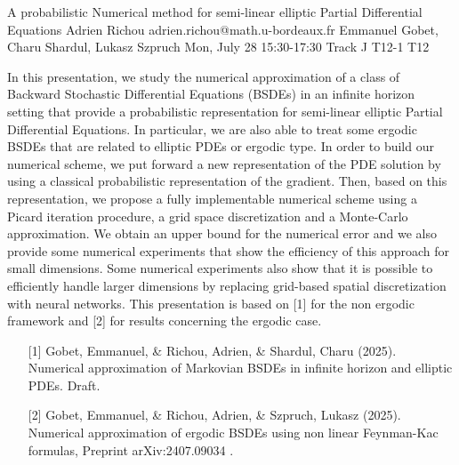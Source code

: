 \begin{talk}
  {A probabilistic Numerical method for semi-linear elliptic Partial Differential Equations}%
  {Adrien Richou}%
  {adrien.richou@math.u-bordeaux.fr}%
  {Emmanuel Gobet, Charu Shardul, Lukasz Szpruch}%
  {}%
  {}%
  {Mon, July 28 15:30-17:30 Track J}%
  {T12-1}%
  {T12}%
  
				
			
In this presentation, we study the numerical approximation of a class of Backward Stochastic Differential Equations (BSDEs) in an infinite horizon setting that provide a probabilistic representation for semi-linear elliptic Partial Differential Equations. In particular, we are also able to treat some ergodic BSDEs that are related to elliptic PDEs or ergodic type. In order to build our numerical scheme, we put forward a new representation of the PDE solution by using a classical probabilistic representation of the gradient. Then, based on this representation, we propose a fully implementable numerical scheme using a Picard iteration procedure, a grid space discretization and a Monte-Carlo approximation. We obtain an upper bound for the numerical error and we also provide some numerical experiments that show the
efficiency of this approach for small dimensions. Some numerical experiments also show that it is possible to efficiently handle larger dimensions by replacing grid-based spatial discretization with neural networks. This presentation is based on [1] for the non ergodic framework and [2] for results concerning the ergodic case.

\medskip

\begin{enumerate}
	\item[{[1]}] Gobet, Emmanuel, \& Richou, Adrien, \& Shardul, Charu (2025). Numerical approximation of Markovian BSDEs in infinite
  horizon and elliptic PDEs. Draft.
	\item[{[2]}] Gobet, Emmanuel, \& Richou, Adrien, \& Szpruch, Lukasz (2025).  Numerical approximation of ergodic BSDEs using non
  linear Feynman-Kac formulas, Preprint arXiv:2407.09034 .
\end{enumerate}

\end{talk}

